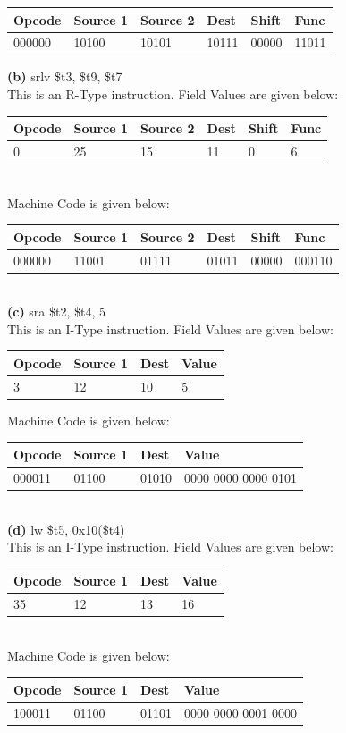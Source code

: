\begin{tabularx}{\textwidth}{|X|X|X|X|X|X|}
\hline
Opcode&Source 1&Source 2&Dest&Shift&Func \\
\hline
000000&10100&10101&10111&00000&11011 \\
\hline
\end{tabularx}
\textbf{(b)} srlv \$t3, \$t9, \$t7 \\
This is an R-Type instruction. Field Values are given below: \\
\begin{tabularx}{\textwidth}{|X|X|X|X|X|X|}
\hline
Opcode&Source 1&Source 2&Dest&Shift&Func \\
\hline
0&25&15&11&0&6 \\
\hline
\end{tabularx}\\
Machine Code is given below: \\
\begin{tabularx}{\textwidth}{|X|X|X|X|X|X|}
\hline
Opcode&Source 1&Source 2&Dest&Shift&Func\\
\hline
000000&11001&01111&01011&00000&000110\\
\hline
\end{tabularx}\\
\textbf{(c)} sra \$t2, \$t4, 5 \\
This is an I-Type instruction. Field Values are given below: \\
\begin{tabularx}{\textwidth}{|X|X|X|X|}
\hline
Opcode&Source 1&Dest&Value\\
\hline
3&12&10&5\\
\hline
\end{tabularx}
Machine Code is given below:\\
\begin{tabularx}{\textwidth}{|X|X|X|X|}
\hline
Opcode&Source 1&Dest&Value\\
\hline
000011&01100&01010&0000 0000 0000 0101\\
\hline
\end{tabularx}\\
\textbf{(d)} lw \$t5, 0x10(\$t4) \\
This is an I-Type instruction. Field Values are given below:\\
\begin{tabularx}{\textwidth}{|X|X|X|X|}
\hline
Opcode&Source 1&Dest&Value\\
\hline
35&12&13&16\\
\hline
\end{tabularx}\\
Machine Code is given below:\\
\begin{tabularx}{\textwidth}{|X|X|X|X|}
\hline
Opcode&Source 1&Dest&Value\\
\hline
100011&01100&01101&0000 0000 0001 0000\\
\hline
\end{tabularx}
